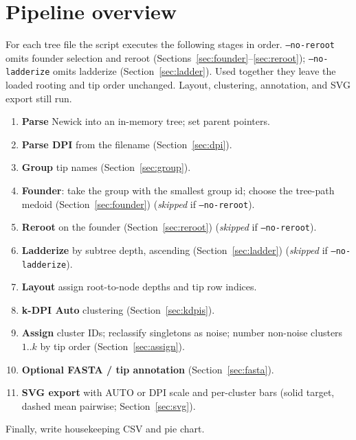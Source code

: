 \documentclass[11pt,a4paper]{article}
\begin{document}
\section{Pipeline overview}

For each tree file the script executes the following stages in order.
\texttt{--no-reroot} omits founder selection and reroot
(Sections~\ref{sec:founder}--\ref{sec:reroot});
\texttt{--no-ladderize} omits ladderize (Section~\ref{sec:ladder}).
Used together they leave the loaded rooting and tip order unchanged.
Layout, clustering, annotation, and SVG export still run.

\begin{enumerate}
  \item \textbf{Parse} Newick into an in-memory tree; set parent pointers.
  \item \textbf{Parse DPI} from the filename (Section~\ref{sec:dpi}).
  \item \textbf{Group} tip names (Section~\ref{sec:group}).
  \item \textbf{Founder}: take the group with the smallest group id; choose the
        tree-path medoid (Section~\ref{sec:founder})
        (\emph{skipped} if \texttt{--no-reroot}).
  \item \textbf{Reroot} on the founder (Section~\ref{sec:reroot})
        (\emph{skipped} if \texttt{--no-reroot}).
  \item \textbf{Ladderize} by subtree depth, ascending (Section~\ref{sec:ladder})
        (\emph{skipped} if \texttt{--no-ladderize}).
  \item \textbf{Layout} assign root-to-node depths and tip row indices.
  \item \textbf{k-DPI Auto} clustering (Section~\ref{sec:kdpis}).
  \item \textbf{Assign} cluster IDs; reclassify singletons as noise;
        number non-noise clusters $1..k$ by tip order (Section~\ref{sec:assign}).
  \item \textbf{Optional FASTA / tip annotation} (Section~\ref{sec:fasta}).
  \item \textbf{SVG export} with AUTO or DPI scale and per-cluster bars
        (solid target, dashed mean pairwise; Section~\ref{sec:svg}).
\end{enumerate}
Finally, write housekeeping CSV and pie chart.
\end{document}
